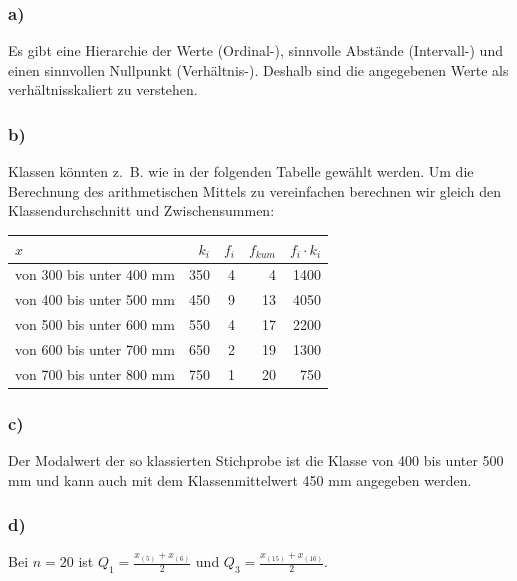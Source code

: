 \documentclass[
  11pt,
  ngerman,
  a4paper,
]{report}
\begin{document}
\hypertarget{a-7}{%
\subsubsection{a)}\label{a-7}}

Es gibt eine Hierarchie der Werte (Ordinal-), sinnvolle Abstände (Intervall-) und einen sinnvollen Nullpunkt (Verhältnis-). Deshalb sind die angegebenen Werte als verhältnisskaliert zu verstehen.

\hypertarget{b-7}{%
\subsubsection{b)}\label{b-7}}

Klassen könnten z.~B. wie in der folgenden Tabelle gewählt werden. Um die Berechnung des arithmetischen Mittels zu vereinfachen berechnen wir gleich den Klassendurchschnitt und Zwischensummen:

\begin{table}[H]
\centering
\begin{tabular}{lrrrr}
\toprule
$x$ & $k_i$ & $f_i$ & $f_{kum}$ & $f_i \cdot k_i$\\
\midrule
von 300 bis unter 400 mm & 350 & 4 & 4 & 1400\\
von 400 bis unter 500 mm & 450 & 9 & 13 & 4050\\
von 500 bis unter 600 mm & 550 & 4 & 17 & 2200\\
von 600 bis unter 700 mm & 650 & 2 & 19 & 1300\\
von 700 bis unter 800 mm & 750 & 1 & 20 & 750\\
\bottomrule
\end{tabular}
\end{table}

\hypertarget{c-6}{%
\subsubsection{c)}\label{c-6}}

Der Modalwert der so klassierten Stichprobe ist die Klasse von 400 bis unter 500 mm und kann auch mit dem Klassenmittelwert 450 mm angegeben werden.

\hypertarget{d-1}{%
\subsubsection{d)}\label{d-1}}

Bei \(n=20\) ist \(Q_1=\frac{x_{(5)}+x_{(6)}}{2}\) und \(Q_3=\frac{x_{(15)}+x_{(16)}}{2}\).
\end{document}
